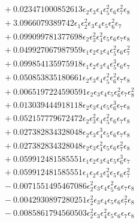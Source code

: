 \documentclass[10pt]{article}
\begin{document}
\begin{align*}
&{}  + 0.023471000852613 \epsilon_{2} \epsilon_{3} \epsilon_{4} \epsilon_{5}^{2} \epsilon_{6} \epsilon_{7}^{2} \epsilon_{8} \\
&{}  + 3.0966079389742 \epsilon_{1} \epsilon_{2}^{2} \epsilon_{3} \epsilon_{4} \epsilon_{5} \epsilon_{6}^{2} \epsilon_{7} \\
&{}  + 0.099099781377698 \epsilon_{2} \epsilon_{3}^{2} \epsilon_{4}^{2} \epsilon_{5} \epsilon_{6} \epsilon_{7} \epsilon_{8} \\
&{}  + 0.049927067987959 \epsilon_{1} \epsilon_{2} \epsilon_{3} \epsilon_{4} \epsilon_{5}^{2} \epsilon_{6} \epsilon_{7}^{2} \\
&{}  + 0.099854135975918 \epsilon_{1} \epsilon_{2} \epsilon_{3} \epsilon_{4} \epsilon_{5}^{3} \epsilon_{6} \epsilon_{7} \\
&{}  + 0.050853835180661 \epsilon_{2} \epsilon_{3} \epsilon_{4} \epsilon_{5}^{2} \epsilon_{6}^{2} \epsilon_{7} \epsilon_{8} \\
&{}  + 0.0065197224590591 \epsilon_{2} \epsilon_{3} \epsilon_{4} \epsilon_{5} \epsilon_{6}^{2} \epsilon_{7} \epsilon_{8}^{2} \\
&{}  + 0.013039444918118 \epsilon_{2} \epsilon_{3} \epsilon_{4} \epsilon_{5} \epsilon_{6}^{3} \epsilon_{7} \epsilon_{8} \\
&{}  + 0.052157779672472 \epsilon_{2} \epsilon_{3}^{2} \epsilon_{4} \epsilon_{5}^{2} \epsilon_{6} \epsilon_{7} \epsilon_{8} \\
&{}  + 0.027382834328048 \epsilon_{2} \epsilon_{3} \epsilon_{4}^{3} \epsilon_{5} \epsilon_{6} \epsilon_{7} \epsilon_{8} \\
&{}  + 0.027382834328048 \epsilon_{2} \epsilon_{3} \epsilon_{4}^{2} \epsilon_{5} \epsilon_{6} \epsilon_{7}^{2} \epsilon_{8} \\
&{}  + 0.059912481585551 \epsilon_{1} \epsilon_{2} \epsilon_{3} \epsilon_{4} \epsilon_{5} \epsilon_{6}^{3} \epsilon_{7} \\
&{}  + 0.059912481585551 \epsilon_{1} \epsilon_{2} \epsilon_{3} \epsilon_{4}^{2} \epsilon_{5} \epsilon_{6} \epsilon_{7}^{2} \\
&{}  - 0.0071551495467086 \epsilon_{2}^{2} \epsilon_{3} \epsilon_{4} \epsilon_{5}^{2} \epsilon_{6} \epsilon_{7} \epsilon_{8} \\
&{}  - 0.0042930897280251 \epsilon_{2}^{2} \epsilon_{3} \epsilon_{4} \epsilon_{5} \epsilon_{6} \epsilon_{7}^{2} \epsilon_{8} \\
&{}  - 0.0085861794560503 \epsilon_{2}^{2} \epsilon_{3} \epsilon_{4}^{2} \epsilon_{5} \epsilon_{6} \epsilon_{7} \epsilon_{8} \\

\end{align*}
\end{document}
